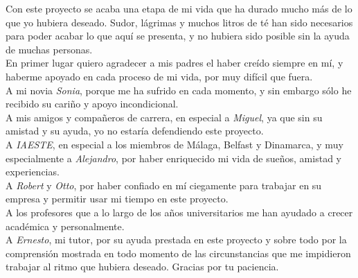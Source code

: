 \cleardoublepage
\thispagestyle{empty}

\begin{minipage}[c][\textheight][c]{\textwidth}
\raggedleft

Con este proyecto se acaba una etapa de mi vida que ha durado mucho más de lo que yo hubiera deseado. Sudor, lágrimas y muchos litros de té han sido necesarios para poder acabar lo que aquí se presenta, y no hubiera sido posible sin la ayuda de muchas personas.\\
En primer lugar quiero agradecer a mis padres el haber creído siempre en mí, y haberme apoyado en cada proceso de mi vida, por muy difícil que fuera. \\
A mi novia \emph{Sonia}, porque me ha sufrido en cada momento, y sin embargo sólo he recibido su cariño y apoyo incondicional. \\
A mis amigos y compañeros de carrera, en especial a \emph{Miguel}, ya que sin su amistad y su ayuda, yo no estaría defendiendo este proyecto. \\

A \emph{IAESTE}, en especial a los miembros de Málaga, Belfast y Dinamarca, y muy especialmente a \emph{Alejandro}, por haber enriquecido mi vida de sueños, amistad y experiencias. \\

A \emph{Robert} y \emph{Otto}, por haber confiado en mí ciegamente para trabajar en su empresa y permitir usar mi tiempo en este proyecto. \\

A los profesores que a lo largo de los años universitarios me han ayudado a crecer académica y personalmente. \\

A \emph{Ernesto}, mi tutor, por su ayuda prestada en este proyecto y sobre todo por la comprensión mostrada en todo momento de las circunstancias que me impidieron trabajar al ritmo que hubiera deseado. Gracias por tu paciencia.

\end{minipage}

\blankpage